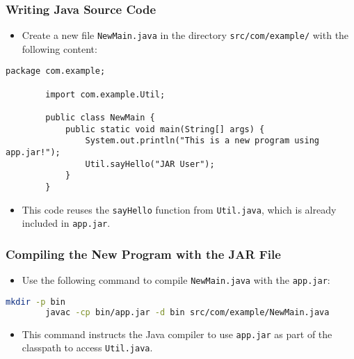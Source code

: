\documentclass[aspectratio=169, table]{beamer}
\begin{document}
\begin{frame}[fragile]
	\frametitle{Writing Java Source Code}
	\begin{itemize}
		\item Create a new file \texttt{NewMain.java} in the directory \texttt{src/com/example/} with the following content:
	\end{itemize}
	\begin{lstlisting}[style=JavaStyle]
		package com.example;
		
		import com.example.Util;
		
		public class NewMain {
			public static void main(String[] args) {
				System.out.println("This is a new program using app.jar!");
				Util.sayHello("JAR User");
			}
		}
	\end{lstlisting}
	\begin{itemize}
		\item This code reuses the \texttt{sayHello} function from \texttt{Util.java}, which is already included in \texttt{app.jar}.
	\end{itemize}
\end{frame}


\begin{frame}[fragile]
	\frametitle{Compiling the New Program with the JAR File}
	\begin{itemize}
		\item Use the following command to compile \texttt{NewMain.java} with the \texttt{app.jar}:
	\end{itemize}
	\begin{lstlisting}[language=bash]
		mkdir -p bin
		javac -cp bin/app.jar -d bin src/com/example/NewMain.java
	\end{lstlisting}
	\begin{itemize}
		\item This command instructs the Java compiler to use \texttt{app.jar} as part of the classpath to access \texttt{Util.java}.
	\end{itemize}
\end{frame}
\end{document}
